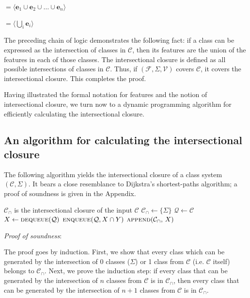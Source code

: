 \documentclass[11pt, oneside]{article}   	%
\begin{document}
\quad $= \langle \mathbf{e}_1 \cup \mathbf{e}_2 \cup \ldots \cup \mathbf{e}_n \rangle$

\quad $= \langle \bigcup_i  \mathbf{e}_i \rangle$

\vspace{\baselineskip} \noindent The preceding chain of logic demonstrates the following fact: if a class can be expressed as the intersection of classes in $\mathcal C$, then its features are the union of the features in each of those classes. The intersectional closure is defined as all possible intersections of classes in $\mathcal C$. Thus, if $(\mathcal F, \Sigma, \mathcal V)$ covers $\mathcal C$, it covers the intersectional closure. This completes the proof.

Having illustrated the formal notation for features and the notion of intersectional closure, we turn now to a dynamic programming algorithm for efficiently calculating the intersectional closure.

\subsection{An algorithm for calculating the intersectional closure}

The following algorithm yields the intersectional closure of a class system $(\mathcal C, \Sigma)$. It bears a close resemblance to Dijkstra's shortest-paths algorithm; a proof of soundness is given in the Appendix.

\noindent \begin{algorithmic}
    \ENSURE $\mathcal C_\cap$ is the intersectional closure of the input $\mathcal C$
    \STATE
    \STATE $\mathcal C_\cap \leftarrow \{ \Sigma \} $
    \STATE $\mathcal Q \leftarrow \mathcal C$
    \STATE
        \STATE $X \leftarrow \textsc{dequeue}(\mathcal Q)$
                \STATE $\textsc{enqueue}(\mathcal Q, X \cap Y)$
            \ENDFOR
            \STATE $\textsc{append}(\mathcal C_\cap, \, X)$
        \ENDIF
    \ENDWHILE
\end{algorithmic}

\vspace{\baselineskip} \noindent \textit{Proof of soundness}:

The proof goes by induction. First, we show that every class which can be generated by the intersection of $0$ classes ($\Sigma$) or 1 class from $\mathcal C$ (i.e. $\mathcal C$ itself) belongs to $\mathcal C_\cap$. Next, we prove the induction step: if every class that can be generated by the intersection of $n$ classes from $\mathcal C$ is in $\mathcal C_\cap$, then every class that can be generated by the intersection of $n+1$ classes from $\mathcal C$ is in $\mathcal C_\cap$.
\end{document}
